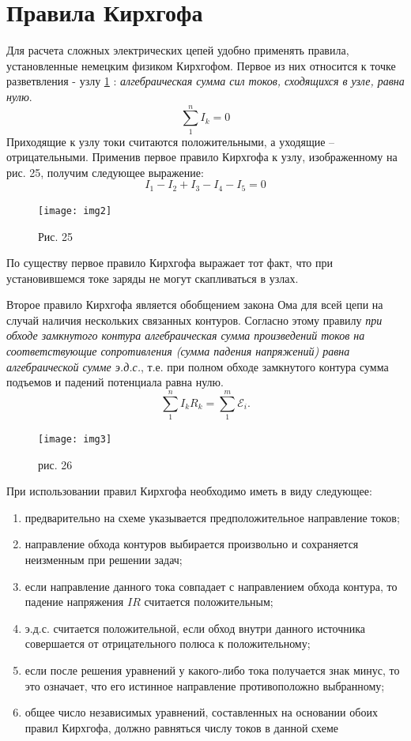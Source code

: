 \documentclass[a4paper,10pt]{book}
\begin{document}
\section{Правила Кирхгофа}
Для расчета сложных электрических цепей удобно применять правила, установленные немецким физиком Кирхгофом. Первое из них относится к точке разветвления - узлу \ref{img2} : \emph{алгебраическая сумма сил токов, сходящихся в узле, равна нулю}.
\begin{equation}\label{kirchgoff1}
 \sum_1^n I_k = 0
\end{equation}
Приходящие к узлу токи считаются положительными, а уходящие -- отрицательными. Применив первое правило Кирхгофа к узлу, изображенному на рис. 25, получим следующее выражение:
\begin{equation*}
 I_1 - I_2 + I_3 - I_4 - I_5 = 0
\end{equation*}
\begin{figure}[h]
\texttt{[image: img2]}
\caption{Рис. 25}
\label{img2}
\end{figure}
По существу первое правило Кирхгофа выражает тот факт, что при установившемся токе заряды не могут скапливаться в узлах.

Второе правило Кирхгофа является обобщением закона Ома для всей цепи на случай наличия нескольких связанных контуров. Согласно этому правилу \emph{при обходе замкнутого контура алгебраическая сумма произведений токов на соответствующие сопротивления (сумма падения напряжений) равна алгебраической сумме э.д.с.}, т.е. при полном обходе замкнутого контура сумма подъемов и падений потенциала равна нулю.
\begin{equation}\label{kirchgoff2}
 \sum_1^n I_kR_k = \sum_1^m\mathcal{E}_i.
\end{equation}
\begin{figure}[h]
\texttt{[image: img3]}
\caption{рис. 26}
\label{img3}
\end{figure}
При использовании правил Кирхгофа необходимо иметь в виду следующее:
\begin{enumerate}
 \item предварительно на схеме указывается предположительное направление токов;
 \item направление обхода контуров выбирается произвольно и сохраняется неизменным при решении задач;
 \item если направление данного тока совпадает с направлением обхода контура, то падение напряжения $IR$ считается положительным;
 \item э.д.с. считается положительной, если обход внутри данного источника совершается от отрицательного полюса к положительному;
 \item если после решения уравнений у какого-либо тока получается знак минус, то это означает, что его истинное направление противоположно выбранному;
 \item общее число независимых уравнений, составленных на основании обоих правил Кирхгофа, должно равняться числу токов в данной схеме
\end{enumerate}
\end{document}
